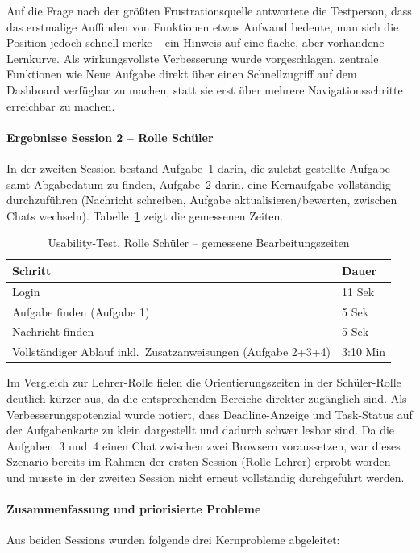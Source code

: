 Auf die Frage nach der größten Frustrationsquelle antwortete die Testperson, dass das erstmalige Auffinden von Funktionen etwas Aufwand bedeute, man sich die Position jedoch schnell merke -- ein Hinweis auf eine flache, aber vorhandene Lernkurve. Als wirkungsvollste Verbesserung wurde vorgeschlagen, zentrale Funktionen wie \glqq{}Neue Aufgabe\grqq{} direkt über einen Schnellzugriff auf dem Dashboard verfügbar zu machen, statt sie erst über mehrere Navigationsschritte erreichbar zu machen.

\paragraph{Ergebnisse Session 2 -- Rolle Schüler}
In der zweiten Session bestand Aufgabe~1 darin, die zuletzt gestellte Aufgabe samt Abgabedatum zu finden, Aufgabe~2 darin, eine Kernaufgabe vollständig durchzuführen (Nachricht schreiben, Aufgabe aktualisieren/bewerten, zwischen Chats wechseln). Tabelle~\ref{tab:usability_schueler} zeigt die gemessenen Zeiten.

\begin{table}[H]
    \centering
    \caption{Usability-Test, Rolle Schüler -- gemessene Bearbeitungszeiten}
    \label{tab:usability_schueler}
    \begin{tabularx}{\textwidth}{lX}
        \toprule
        \textbf{Schritt} & \textbf{Dauer} \\
        \midrule
        Login & 11 Sek \\
        Aufgabe finden (Aufgabe 1) & 5 Sek \\
        Nachricht finden & 5 Sek \\
        Vollständiger Ablauf inkl.\ Zusatzanweisungen (Aufgabe 2+3+4) & 3:10 Min \\
        \bottomrule
    \end{tabularx}
\end{table}

Im Vergleich zur Lehrer-Rolle fielen die Orientierungszeiten in der Schüler-Rolle deutlich kürzer aus, da die entsprechenden Bereiche direkter zugänglich sind. Als Verbesserungspotenzial wurde notiert, dass Deadline-Anzeige und Task-Status auf der Aufgabenkarte zu klein dargestellt und dadurch schwer lesbar sind. Da die Aufgaben~3 und~4 einen Chat zwischen zwei Browsern voraussetzen, war dieses Szenario bereits im Rahmen der ersten Session (Rolle Lehrer) erprobt worden und musste in der zweiten Session nicht erneut vollständig durchgeführt werden.

\paragraph{Zusammenfassung und priorisierte Probleme}
Aus beiden Sessions wurden folgende drei Kernprobleme abgeleitet:

